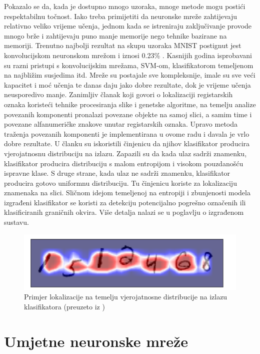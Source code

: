 \documentclass[times, utf8, diplomski]{fer}
\theoremstyle{definition}
\begin{document}
Pokazalo se da, kada je dostupno mnogo uzoraka, mnoge metode mogu postići respektabilnu točnost. Iako treba primijetiti da neuronske mreže zahtijevaju relativno veliko vrijeme učenja, jednom kada se istreniraju zaključivanje provode mnogo brže i zahtijevaju puno manje memorije nego tehnike bazirane na memoriji. Trenutno najbolji rezultat na skupu uzoraka MNIST postignut jest konvolucijskom neuronskom mrežom i iznosi 0.23\% \cite{6248110}. Kasnijih godina isprobavani su razni pristupi s konvolucijskim mrežama, SVM-om, klasifikatorom temeljenom na najbližim susjedima itd. Mreže su postajale sve kompleksnije, imale su sve veći kapacitet i moć učenja te danas daju jako dobre rezultate, dok je vrijeme učenja neusporedivo manje. Zanimljiv članak \cite{6490368} koji govori o lokalizaciji registarskih oznaka koristeći tehnike procesiranja slike i genetske algoritme, na temelju analize povezanih komponenti pronalazi povezane objekte na samoj slici, a samim time i povezane alfanumeričke znakove unutar registarskih oznaka. Upravo metoda traženja povezanih komponenti je implementirana u ovome radu i davala je vrlo dobre rezultate. U članku \cite{DL2018} su iskoristili činjenicu da njihov klasifikator producira vjerojatnosnu distribuciju na izlazu. Zapazili su da kada ulaz sadrži znamenku, klasifikator producira distribuciju s malom entropijom i visokom pouzdanošću ispravne klase. S druge strane, kada ulaz ne sadrži znamenku, klasifikator producira gotovo uniformnu distribuciju. Tu činjenicu koriste za lokalizaciju znamenaka na slici. Sličnom idejom temeljenoj na entropiji i zbunjenosti modela izgrađeni klasifikator se koristi za detekciju potencijalno pogrešno označenih ili klasificiranih graničnih okvira. Više detalja nalazi se u poglavlju o izgrađenom sustavu.
\begin{figure}[h]
\centering
\includegraphics[scale=0.6]{localization_entropy.png}
\caption{Primjer lokalizacije na temelju vjerojatnosne distribucije na izlazu klasifikatora  (preuzeto iz \cite{DL2018})}
\end{figure}


\chapter{Umjetne neuronske mreže}
\end{document}
